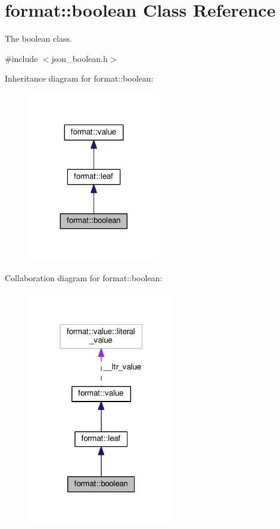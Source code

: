 \hypertarget{classformat_1_1boolean}{}\section{format\+:\+:boolean Class Reference}
\label{classformat_1_1boolean}


The boolean class.  




{\ttfamily \#include $<$json\+\_\+boolean.\+h$>$}



Inheritance diagram for format\+:\+:boolean\+:
\nopagebreak
\begin{figure}[H]
\begin{center}
\leavevmode
\includegraphics[width=164pt]{classformat_1_1boolean__inherit__graph}
\end{center}
\end{figure}


Collaboration diagram for format\+:\+:boolean\+:
\nopagebreak
\begin{figure}[H]
\begin{center}
\leavevmode
\includegraphics[width=183pt]{classformat_1_1boolean__coll__graph}
\end{center}
\end{figure}

